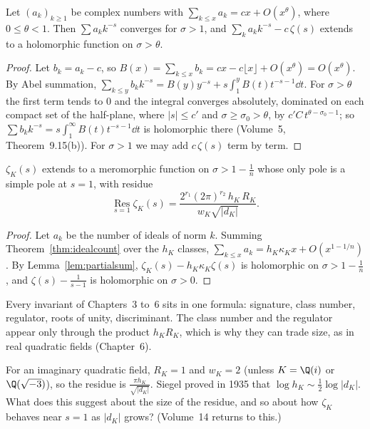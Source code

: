 \begin{lemma}\label{lem:partialsum}
Let $(a_k)_{k\ge1}$ be complex numbers with $\sum_{k\le x}a_k=cx+O(x^\theta)$, where $0\le\theta<1$. Then $\sum a_kk^{-s}$ converges for
$\sigma>1$, and $\sum_ka_kk^{-s}-c\,\zeta(s)$ extends to a holomorphic function on $\sigma>\theta$.
\end{lemma}
\begin{proof}
Let $b_k=a_k-c$, so $B(x)=\sum_{k\le x}b_k=cx-c\lfloor x\rfloor+O(x^\theta)=O(x^\theta)$. By Abel summation, $\sum_{k\le y}b_kk^{-s}=
B(y)y^{-s}+s\int_1^yB(t)t^{-s-1}\dd t$. For $\sigma>\theta$ the first term tends to $0$ and the integral converges absolutely,
dominated on each compact set of the half-plane, where $|s|\le c'$ and $\sigma\ge\sigma_0>\theta$, by $c'C\,t^{\theta-\sigma_0-1}$; so $\sum b_kk^{-s}=s\int_1^\infty B(t)t^{-s-1}\dd t$ is
holomorphic there (Volume~5, Theorem~9.15(b)). For $\sigma>1$ we may add $c\,\zeta(s)$ term by term.
\end{proof}

\begin{theorem}\label{thm:cnf}
$\zeta_K(s)$ extends to a meromorphic function on $\sigma>1-\frac1n$ whose only pole is a simple pole at $s=1$, with residue
\[
\operatorname*{Res}_{s=1}\zeta_K(s)=\frac{2^{r_1}(2\pi)^{r_2}\,h_K\,R_K}{w_K\sqrt{|d_K|}}.
\]
\end{theorem}
\begin{proof}
Let $a_k$ be the number of ideals of norm $k$. Summing Theorem~\ref{thm:idealcount} over the $h_K$ classes, $\sum_{k\le x}a_k=h_K\kappa_Kx+
O(x^{1-1/n})$. By Lemma~\ref{lem:partialsum}, $\zeta_K(s)-h_K\kappa_K\zeta(s)$ is holomorphic on $\sigma>1-\frac1n$, and $\zeta(s)-\frac1{s-1}$
is holomorphic on $\sigma>0$.
\end{proof}

Every invariant of Chapters~3 to~6 sits in one formula: signature, class number, regulator, roots of unity, discriminant. The class number
and the regulator appear only through the product $h_KR_K$, which is why they can trade size, as in real quadratic fields
(Chapter~6).

\begin{think}
For an imaginary quadratic field, $R_K=1$ and $w_K=2$ (unless $K=\Q(i)$ or $\Q(\sqrt{-3})$), so the residue is $\frac{\pi h_K}{\sqrt{|d_K|}}$.
Siegel proved in 1935 that $\log h_K\sim\frac12\log|d_K|$. What does this suggest about the size of the residue, and so about how
$\zeta_K$ behaves near $s=1$ as $|d_K|$ grows? (Volume~14 returns to this.)
\end{think}

